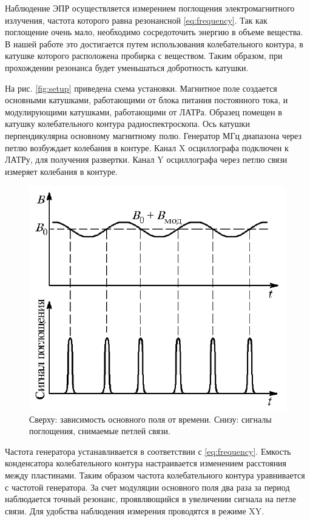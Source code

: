 \documentclass[12pt,a4paper]{article}
\begin{document}
	Наблюдение ЭПР осуществляется измерением поглощения электромагнитного излучения, частота которого равна резонансной \eqref{eq:frequency}. Так как поглощение очень мало, необходимо сосредоточить энергию в объеме вещества. В нашей работе это достигается путем использования колебательного контура, в катушке которого расположена пробирка с веществом. Таким образом, при прохождении резонанса будет уменьшаться добротность катушки.
	
	На рис. \ref{fig:setup} приведена схема установки. Магнитное поле создается основными катушками, работающими от блока питания постоянного тока, и модулирующими катушками, работающими от ЛАТРа. Образец помещен в катушку колебательного контура радиоспектроскопа. Ось катушки перпендикулярна основному магнитному полю. Генератор МГц диапазона через петлю возбуждает колебания в контуре. Канал X осциллографа подключен к ЛАТРу, для получения развертки. Канал Y осциллографа через петлю связи измеряет колебания в контуре.
	
	\begin{figure}[H]
		\centering
		\includegraphics[scale=0.7]{res/signal.png}
		\caption{\centering
			 	 Сверху: зависимость основного поля от времени.\newline
			 	 Снизу: сигналы поглощения, снимаемые петлей связи.}
		\label{fig:metal}
	\end{figure}
	
	Частота генератора устанавливается в соответствии с \eqref{eq:frequency}. Емкость конденсатора колебательного контура настраивается изменением расстояния между пластинами. Таким образом частота колебательного контура уравнивается с частотой генератора. За счет модуляции основного поля два раза за период наблюдается точный резонанс, проявляющийся в увеличении сигнала на петле связи. Для удобства наблюдения измерения проводятся в режиме XY.
	
\end{document}
